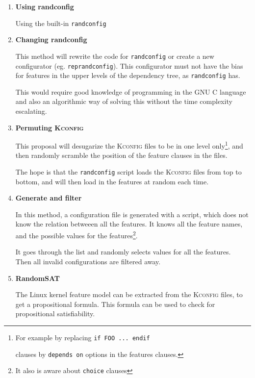 \documentclass[a4paper,11pt]{report}
\newcommand{\f}{\footnote{\fn}}
\newcommand{\textcode}[1]{
    \fboxsep=1pt
    \texttt{\colorbox{gray!20}{#1}}
}
\begin{document}
\begin{enumerate}

    \item \textbf{Using randconfig}

Using the built-in \texttt{randconfig}

    \item \textbf{Changing randconfig}

This method will rewrite the code for \texttt{randconfig} or create a new 
configurator (eg. \texttt{reprandconfig}).  This configurator must not have the 
bias for features in the upper levels of the dependency tree, as 
\texttt{randconfig} has.

This would require good knowledge of programming in the \textsc{GNU C} language
and also an algorithmic way of solving this without the time complexity 
escalating.


    \item \textbf{Permuting \textsc{Kconfig}}

            \def \fn {For example by replacing \textcode{if FOO ... endif} 
            clauses by \textcode{depends on} options in the features clauses.}

This proposal will desugarize the \textsc{Kconfig} files to be in one level 
only\f, and then randomly scramble the position of the feature clauses in the 
files. 

The hope is that the \texttt{randconfig} script loads the \textsc{Kconfig} 
files from top to bottom, and will then load in the features at random each 
time.


    \item \textbf{Generate and filter}

            \def \fn {It also is aware about \texttt{choice} clauses}

In this method, a configuration file is generated with a script, which 
does not know the relation betweeen all the features. It knows all the feature
names, and the possible values for the features\f.

It goes through the list and randomly selects values for all the features. 
\\

Then all invalid configurations are filtered away.


    \item \textbf{RandomSAT}

The Linux kernel feature model can be extracted from the \textsc{Kconfig} 
files, to get a propositional formula\cite{lvat}. This formula can be used to 
check for propositional satisfiability.


    
\end{enumerate}
\end{document}
